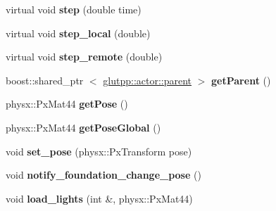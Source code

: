 \begin{DoxyCompactItemize}
\item 
\hypertarget{classglutpp_1_1actor_1_1actor_ae264fd9182e417cc3d954e91f326f3af}{virtual void {\bfseries step} (double time)}\label{classglutpp_1_1actor_1_1actor_ae264fd9182e417cc3d954e91f326f3af}

\item 
\hypertarget{classglutpp_1_1actor_1_1actor_aaa40cbf3a93ec791ed70ff9a2549dfe2}{virtual void {\bfseries step\-\_\-local} (double)}\label{classglutpp_1_1actor_1_1actor_aaa40cbf3a93ec791ed70ff9a2549dfe2}

\item 
\hypertarget{classglutpp_1_1actor_1_1actor_a432f5368faa9a370dd34a4805ef98c6a}{virtual void {\bfseries step\-\_\-remote} (double)}\label{classglutpp_1_1actor_1_1actor_a432f5368faa9a370dd34a4805ef98c6a}

\item 
\hypertarget{classglutpp_1_1actor_1_1actor_af80344992b0cd75a3a31a35f067534aa}{boost\-::shared\-\_\-ptr\*
$<$ \hyperlink{classglutpp_1_1actor_1_1parent}{glutpp\-::actor\-::parent} $>$ {\bfseries get\-Parent} ()}\label{classglutpp_1_1actor_1_1actor_af80344992b0cd75a3a31a35f067534aa}

\item 
\hypertarget{classglutpp_1_1actor_1_1actor_a121afd55904bd1d7021eb0f481efc12a}{physx\-::\-Px\-Mat44 {\bfseries get\-Pose} ()}\label{classglutpp_1_1actor_1_1actor_a121afd55904bd1d7021eb0f481efc12a}

\item 
\hypertarget{classglutpp_1_1actor_1_1actor_ab60fe1179861339b7d4a53c9177c8c1b}{physx\-::\-Px\-Mat44 {\bfseries get\-Pose\-Global} ()}\label{classglutpp_1_1actor_1_1actor_ab60fe1179861339b7d4a53c9177c8c1b}

\item 
\hypertarget{classglutpp_1_1actor_1_1actor_a496032a2b3dd071243ca77f3a52ce6f0}{void {\bfseries set\-\_\-pose} (physx\-::\-Px\-Transform pose)}\label{classglutpp_1_1actor_1_1actor_a496032a2b3dd071243ca77f3a52ce6f0}

\item 
\hypertarget{classglutpp_1_1actor_1_1actor_a25274295ccfff15c00d9dcabc1dd6192}{void {\bfseries notify\-\_\-foundation\-\_\-change\-\_\-pose} ()}\label{classglutpp_1_1actor_1_1actor_a25274295ccfff15c00d9dcabc1dd6192}

\item 
\hypertarget{classglutpp_1_1actor_1_1actor_a391f6c4407430af818124f2f84aa020f}{void {\bfseries load\-\_\-lights} (int \&, physx\-::\-Px\-Mat44)}\label{classglutpp_1_1actor_1_1actor_a391f6c4407430af818124f2f84aa020f}


\end{DoxyCompactItemize}
